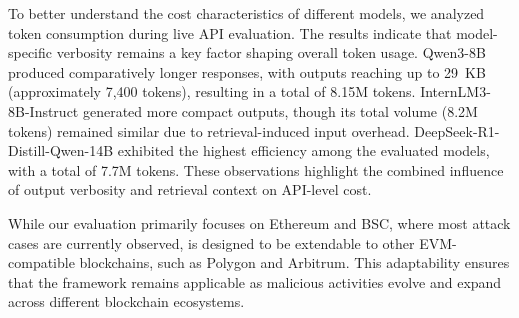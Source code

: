 




To better understand the cost characteristics of different models, we analyzed token consumption during live API evaluation. The results indicate that model-specific verbosity remains a key factor shaping overall token usage. Qwen3-8B produced comparatively longer responses, with outputs reaching up to 29~KB (approximately 7,400 tokens), resulting in a total of 8.15M tokens. InternLM3-8B-Instruct generated more compact outputs, though its total volume (8.2M tokens) remained similar due to retrieval-induced input overhead. DeepSeek-R1-Distill-Qwen-14B exhibited the highest efficiency among the evaluated models, with a total of 7.7M tokens. These observations highlight the combined influence of output verbosity and retrieval context on API-level cost.


While our evaluation primarily focuses on Ethereum and BSC, where most attack cases are currently observed, \approach{} is designed to be extendable to other EVM-compatible blockchains, such as Polygon and Arbitrum. This adaptability ensures that the framework remains applicable as malicious activities evolve and expand across different blockchain ecosystems.

